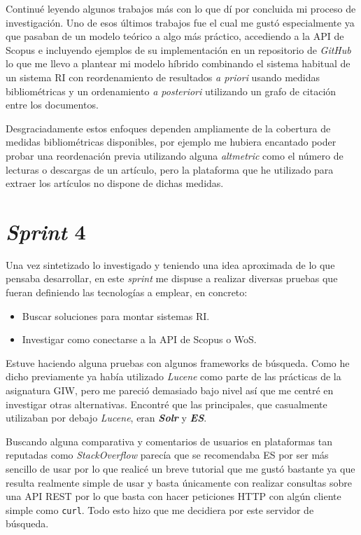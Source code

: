 Continué leyendo algunos trabajos más con lo que dí por concluida mi proceso de investigación. Uno de esos últimos trabajos fue \cite{DBLP:conf/ecir/SarolLS18} el cual me gustó especialmente ya que pasaban de un modelo teórico a algo más práctico, accediendo a la \acrshort{API} de Scopus e incluyendo ejemplos de su implementación en un repositorio de \textit{GitHub} lo que me llevo a plantear mi modelo híbrido combinando el sistema habitual de un sistema \acrshort{RI} con reordenamiento de resultados \textit{a priori} usando medidas bibliométricas y un ordenamiento \textit{a posteriori} utilizando un grafo de citación entre los documentos.

Desgraciadamente estos enfoques dependen ampliamente de la cobertura de medidas bibliométricas disponibles, por ejemplo me hubiera encantado poder probar una reordenación previa utilizando alguna \textit{altmetric} como el número de lecturas o descargas de un artículo, pero la plataforma que he utilizado para extraer los artículos no dispone de dichas medidas.

\section{\textit{Sprint} 4}
Una vez sintetizado lo investigado y teniendo una idea aproximada de lo que pensaba desarrollar, en este \textit{sprint} me dispuse a realizar diversas pruebas que fueran definiendo las tecnologías a emplear, en concreto:
\begin{itemize}
	\item Buscar soluciones para montar sistemas \acrshort{RI}.
	\item Investigar como conectarse a la \acrshort{API} de Scopus o \acrshort{WoS}.
\end{itemize}

Estuve haciendo alguna pruebas con algunos \glspl{framework} de búsqueda. Como he dicho previamente ya había utilizado \textit{Lucene} como parte de las prácticas de la asignatura \acrshort{GIW}, pero me pareció demasiado bajo nivel así que me centré en investigar otras alternativas. Encontré que las principales, que casualmente utilizaban por debajo \textit{Lucene}, eran \textit{\textbf{Solr}} y \textit{\textbf{\acrlong{ES}}}.

Buscando alguna comparativa \cite{ES_Solr} y comentarios de usuarios en plataformas tan reputadas como \textit{StackOverflow} \cite{ES_Solr_SO} parecía que se recomendaba \acrshort{ES} por ser más sencillo de usar por lo que realicé un breve tutorial \cite{ES_tutorial} que me gustó bastante ya que resulta realmente simple de usar y basta únicamente con realizar consultas sobre una \acrshort{API} \acrshort{REST} por lo que basta con hacer peticiones \acrshort{HTTP} con algún cliente simple como \texttt{curl}. Todo esto hizo que me decidiera por este servidor de búsqueda.

